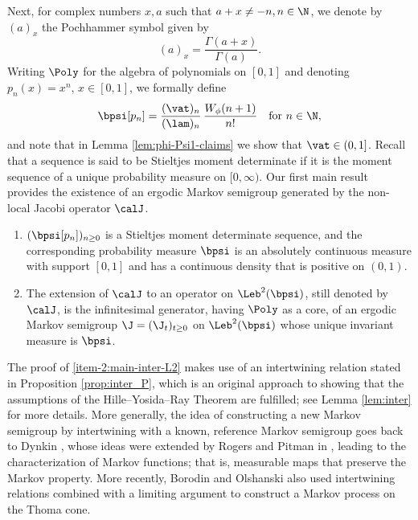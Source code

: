 Next, for complex numbers $x,a$ such that $a+x\neq -n, n\in\N$, we denote by $(a)_x$ the Pochhammer symbol\vspace*{-3pt}
given by
\begin{equation}
\label{eq:defPoc}
(a)_x = \frac{\Gamma(a+x)}{\Gamma(a)}.
\end{equation}
Writing $\Poly$ for the algebra of polynomials on $[0,1]$ and denoting $p_n(x) = x^n$, $x \in [0,1]$,
we formally define\vspace*{-3pt}
\begin{equation}
\label{eq:mom-bpn}
\bpsi[p_n] = \frac{(\vat)_n}{(\lam)_n}\,\frac{W_{\phi}(n+1)}{n!} \quad \mbox{for } n \in \N,
\end{equation}
and note that in Lemma \ref{lem:phi-Psi1-claims} we show that $\vat \in (0,1]$. Recall that a sequence is said to be Stieltjes moment determinate if it is the moment sequence of a unique probability measure on $[0,\infty)$. Our first main result provides the existence of an ergodic Markov semigroup generated by the non-local Jacobi operator $\calJ$.

\skpt
\begin{theorem} \label{thm:main-inter-L2}
\begin{enumerate}
\item \label{item-1:main-inter-L2}
$(\bpsi [ p_n ])_{n \geq 0}$ is a Stieltjes moment determinate sequence, and the corresponding probability measure $\bpsi$ is an absolutely continuous
measure with support $[0,1]$ and has a continuous density that is positive on $(0,1)$.
\item \label{item-2:main-inter-L2} The extension of $\calJ$ to an operator on $\Leb^2(\bpsi)$, still denoted by $\calJ$, is the infinitesimal generator, having $\Poly$ as a core, of an ergodic Markov semigroup $\J = (\J_t)_{t \geq 0}$ on $\Leb^2(\bpsi)$ whose unique invariant measure is $\bpsi$.
\end{enumerate}
\end{theorem}

The proof of \eqref{item-2:main-inter-L2} makes use of an intertwining relation stated in Proposition \ref{prop:inter_P}, which is an original approach to showing that the assumptions of the Hille--Yosida--Ray Theorem are fulfilled; see Lemma \ref{lem:inter} for more details. More generally, the idea of constructing a new Markov semigroup by intertwining with a known, reference Markov semigroup goes back to Dynkin \cite{dynkin:1965}, whose ideas were extended by Rogers and Pitman in \cite{rogers:1981},
leading to the characterization of Markov functions; that is, measurable maps that preserve the Markov property. More recently, Borodin and Olshanski \cite{thoma-cone} also used intertwining relations combined with a limiting argument to construct a Markov process on the Thoma cone.

